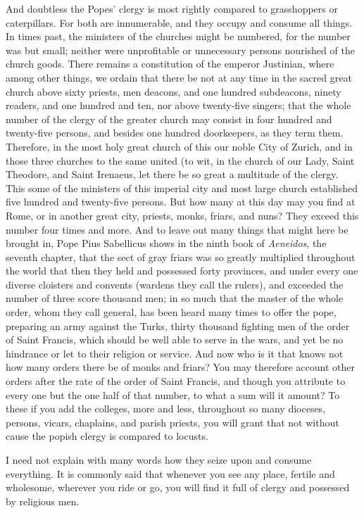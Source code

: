 And doubtless the Popes’ clergy is most rightly compared to grasshoppers or caterpillars. For both are innumerable, and they occupy and consume all things. In times past, the ministers of the churches might be numbered, for the number was but small; neither were unprofitable or unnecessary persons nourished of the church goods. There remains a constitution of the emperor Justinian, where among other things, we ordain that there be not at any time in the sacred great church above sixty priests, men deacons, and one hundred subdeacons, ninety readers, and one hundred and ten, nor above twenty-five singers; that the whole number of the clergy of the greater church may consist in four hundred and twenty-five persons, and besides one hundred doorkeepers, as they term them. Therefore, in the most holy great church of this our noble City of Zurich, and in those three churches to the same united (to wit, in the church of our Lady, Saint Theodore, and Saint Irenaeus, let there be so great a multitude of the clergy. This some of the ministers of this imperial city and most large church established five hundred and twenty-five persons. But how many at this day may you find at Rome, or in another great city, priests, monks, friars, and nuns? They exceed this number four times and more. And to leave out many things that might here be brought in, Pope Pius Sabellicus shows in the ninth book of \textit{Aeneidos}, the seventh chapter, that the sect of gray friars was so greatly multiplied throughout the world that then they held and possessed forty provinces, and under every one diverse cloisters and convents (wardens they call the rulers), and exceeded the number of three score thousand men; in so much that the master of the whole order, whom they call general, has been heard many times to offer the pope, preparing an army against the Turks, thirty thousand fighting men of the order of Saint Francis, which should be well able to serve in the wars, and yet be no hindrance or let to their religion or service. And now who is it that knows not how many orders there be of monks and friars? You may therefore account other orders after the rate of the order of Saint Francis, and though you attribute to every one but the one half of that number, to what a sum will it amount? To these if you add the colleges, more and less, throughout so many dioceses, persons, vicars, chaplains, and parish priests, you will grant that not without cause the popish clergy is compared to locusts.

I need not explain with many words how they seize upon and consume everything. It is commonly said that whenever you see any place, fertile and wholesome, wherever you ride or go, you will find it full of clergy and possessed by religious men.

